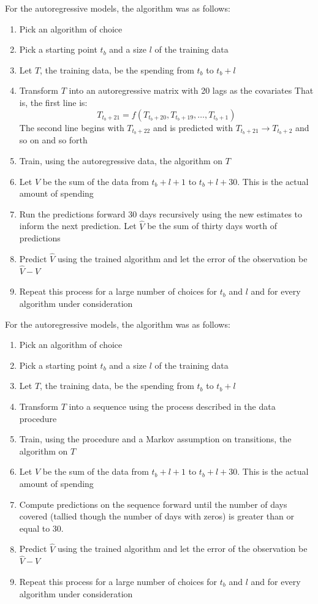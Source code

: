 \documentclass[11pt,a4paper]{article}
\begin{document}
For the autoregressive models, the algorithm was as follows:
\begin{enumerate}
	\item Pick an algorithm of choice
	\item Pick a starting point $ t_b $ and a size $ l $ of the training data
	\item Let $ T $, the training data, be the spending from $ t_b $ to $ t_b + l $
	\item Transform $ T $ into an autoregressive matrix with 20 lags as the covariates That is, the first line is: $$ T_{t_b + 21} = f(T_{t_b + 20}, T_{t_b + 19}, \ldots , T_{t_b + 1}) $$ The second line begins with $ T_{t_b + 22} $ and is predicted with $ T_{t_b + 21} \rightarrow T_{t_b + 2} $ and so on and so forth
	\item Train, using the autoregressive data, the algorithm on $ T $
	\item Let $ V $ be the sum of the data from $ t_b + l + 1 $ to $ t_b + l + 30 $. This is the actual amount of spending
	\item Run the predictions forward 30 days recursively using the new estimates to inform the next prediction. Let $ \hat{V} $ be the sum of thirty days worth of predictions
	\item Predict $ \hat{V} $ using the trained algorithm and let the error of the observation be $ \hat{V} - V $
	\item Repeat this process for a large number of choices for $ t_b $ and $ l $ and for every algorithm under consideration
\end{enumerate}

For the autoregressive models, the algorithm was as follows:
\begin{enumerate}
	\item Pick an algorithm of choice
	\item Pick a starting point $ t_b $ and a size $ l $ of the training data
	\item Let $ T $, the training data, be the spending from $ t_b $ to $ t_b + l $
	\item Transform $ T $ into a \yinyang sequence using the process described in the \yinyang data procedure
	\item Train, using the \yinyang procedure and a Markov assumption on transitions, the algorithm on $ T $
	\item Let $ V $ be the sum of the data from $ t_b + l + 1 $ to $ t_b + l + 30 $. This is the actual amount of spending
	\item Compute predictions on the \yinyang sequence forward until the number of days covered (tallied though the number of days with zeros) is greater than or equal to 30.
	\item Predict $ \hat{V} $ using the trained algorithm and let the error of the observation be $ \hat{V} - V $
	\item Repeat this process for a large number of choices for $ t_b $ and $ l $ and for every algorithm under consideration
\end{enumerate}
\end{document}
